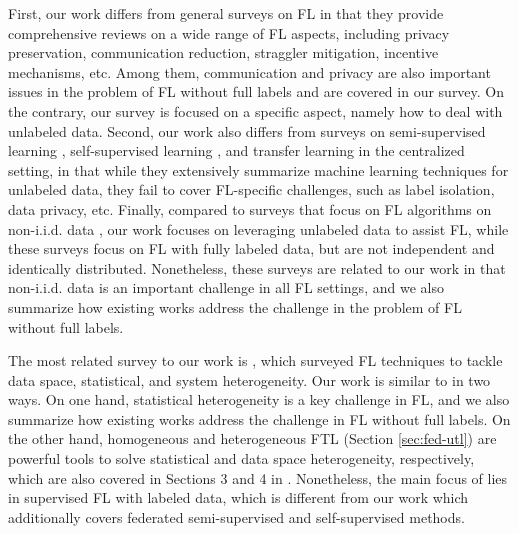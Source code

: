 \documentclass[11pt]{article}
\begin{document}
First, our work differs from general surveys on FL \cite{kairouz2021advances,yang2019federated,li2020federatedsurvey} in that they provide comprehensive reviews on a wide range of FL aspects, including privacy preservation, communication reduction, straggler mitigation, incentive mechanisms, etc. Among them, communication and privacy are also important issues in the problem of FL without full labels and are covered in our survey. On the contrary, our survey is focused on a specific aspect, namely how to deal with unlabeled data. Second, our work also differs from surveys on semi-supervised learning \cite{chapelle2009semi}, self-supervised learning \cite{liu2021self}, and transfer learning \cite{pan2010survey} in the centralized setting, in that while they extensively summarize machine learning techniques for unlabeled data, they fail to cover FL-specific challenges, such as label isolation, data privacy, etc. Finally, compared to surveys that focus on FL algorithms on non-i.i.d. data \cite{wang2021field,li2022federated,zhu2021federated}, our work focuses on leveraging unlabeled data to assist FL, while these surveys focus on FL with fully labeled data, but are not independent and identically distributed. Nonetheless, these surveys are related to our work in that non-i.i.d. data is an important challenge in all FL settings, and we also summarize how existing works address the challenge in the problem of FL without full labels. 

The most related survey to our work is \cite{gao2022survey}, which surveyed FL techniques to tackle data space, statistical, and system heterogeneity. Our work is similar to \cite{gao2022survey} in two ways. On one hand, statistical heterogeneity is a key challenge in FL, and we also summarize how existing works address the challenge in FL without full labels. On the other hand, homogeneous and heterogeneous FTL (Section \ref{sec:fed-utl}) are powerful tools to solve statistical and data space heterogeneity, respectively, which are also covered in Sections 3 and 4 in \cite{gao2022survey}. Nonetheless, the main focus of \cite{gao2022survey} lies in supervised FL with labeled data, which is different from our work which additionally covers federated semi-supervised and self-supervised methods. 
\end{document}
